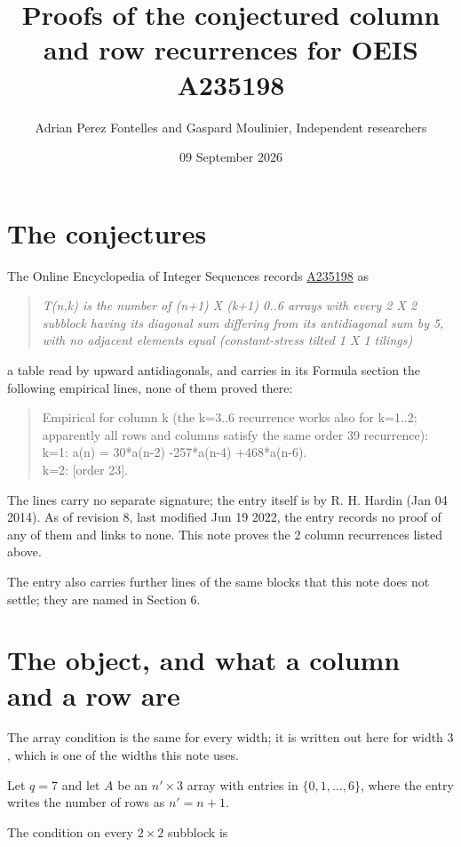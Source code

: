 \documentclass[11pt]{article}
\title{Proofs of the conjectured column and row recurrences for OEIS A235198}
\author{Adrian Perez Fontelles and Gaspard Moulinier, Independent researchers}
\date{09 September 2026}
\theoremstyle{definition}
\begin{document}
\maketitle
\section{The conjectures}

The Online Encyclopedia of Integer Sequences records \href{https://oeis.org/A235198}{A235198} as

\begin{quote}\itshape T(n,k) is the number of (n+1) X (k+1) 0..6 arrays with every 2 X 2 subblock having its diagonal sum differing from its antidiagonal sum by 5, with no adjacent elements equal (constant-stress tilted 1 X 1 tilings)\end{quote}

a table read by upward antidiagonals, and carries in its Formula section the following empirical lines, none of them proved there:

\begin{quote}\ttfamily Empirical for column k (the k=3..6 recurrence works also for k=1..2; apparently all rows and columns satisfy the same order 39 recurrence):\\
k=1: a(n) = 30*a(n-2) -257*a(n-4) +468*a(n-6).\\k=2: [order 23].\end{quote}

The lines carry no separate signature; the entry itself is by R. H. Hardin (Jan 04 2014). As of revision 8, last modified Jun 19 2022, the entry records no proof of any of them and links to none. This note proves the 2 column recurrences listed above.

The entry also carries further lines of the same blocks that this note does not settle; they are named in Section 6.

\section{The object, and what a column and a row are}

The array condition is the same for every width; it is written out here for width $3$, which is one of the widths this note uses.

Let $q = 7$ and let $A$ be an $n' \times 3$ array with entries in $\{0,1,\dots,6\}$, where the entry writes the number of rows as $n' = n + 1$.

The condition on every $2 \times 2$ subblock is
\end{document}
